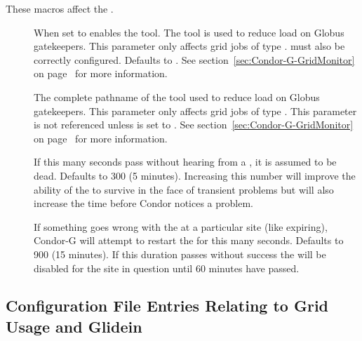 These macros affect the .
\begin{description}

\item[] \label{param:EnableGridMonitor}
  When set to  enables the  tool.  The
   tool is used to reduce load on Globus gatekeepers.
  This parameter only affects 
  grid jobs of type .
   must also be correctly configured.
  Defaults to .
  See section~\ref{sec:Condor-G-GridMonitor} on
  page~\pageref{sec:Condor-G-GridMonitor}
  for more information.

\item[] \label{param:GridMonitor}
  The complete pathname of the  tool used to reduce load on
  Globus gatekeepers.  This parameter only affects 
  grid jobs of type .
  This parameter is not referenced unless
   is set to . 
  See section~\ref{sec:Condor-G-GridMonitor} on
  page~\pageref{sec:Condor-G-GridMonitor}
  for more information.

\item[] \label{param:GridMonitorHeartbeatTimeout}
  If this many seconds pass without hearing from a , it is
  assumed to be dead.  Defaults to 300 (5 minutes).  Increasing this number
  will improve the ability of the  to survive in the face of
  transient problems but will also increase the time before Condor notices a
  problem.

\item[] \label{param:GridMonitorRetryDuration}
  If something goes wrong with the  at a particular site
  (like  expiring), Condor-G will
  attempt to restart the  for this many seconds.  Defaults
  to 900 (15 minutes).  If this duration passes without success the
   will be disabled for the site in question until 60
  minutes have passed.

\end{description}


\subsection{\label{sec:Grid-Config-File-Entries}Configuration File
Entries Relating to Grid Usage and Glidein}

